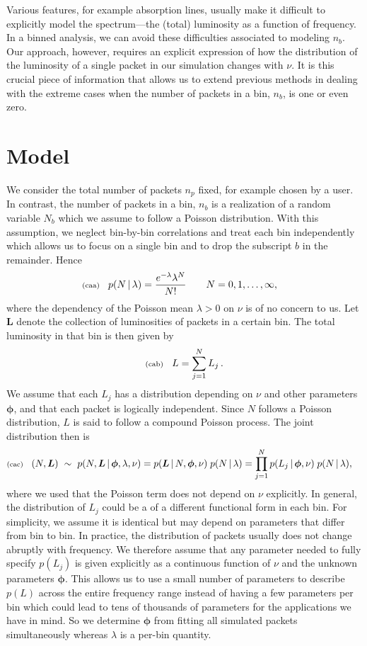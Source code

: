\documentclass[11pt]{article}
\newcommand{\fred}[1]{\todo[color=orange!40,inline]{#1}} %
\newcommand{\lleq}[1]{\label{#1} }
\renewcommand{\lleq}[1]{\label{#1} {\scriptstyle {\rm (#1)}} \hspace*{2ex} }
\newcommand{\cond}{\,|\,}
\newcommand{\bmL}{{\bm{L}}}
\newcommand{\bmphi}{{\bm{\phi}}}
\newcommand{\npack}{n_p}
\begin{document}
Various features, for example absorption lines, usually make it
difficult to explicitly model the spectrum---the (total) luminosity as
a function of frequency. In a binned analysis, we can avoid these
difficulties associated to modeling $n_b$. Our approach, however,
requires an explicit expression of how the distribution of the
luminosity of a single packet in our simulation changes with $\nu$. It
is this crucial piece of information that allows us to extend previous
methods \fred{Refs: Zech, maybe others, too} in dealing with the
extreme cases when the number of packets in a bin, $n_b$, is one or
even zero.

\section{Model} \label{sec:model}

We consider the total number of packets $\npack$ fixed, for example
chosen by a user. In contrast, the number of packets in a bin, $n_b$
is a realization of a random variable $N_b$ which we assume to follow
a Poisson distribution. With this assumption, we neglect bin-by-bin
correlations and treat each bin independently which allows us to focus
on a single bin and to drop the subscript $b$ in the remainder. Hence
\begin{align}
  \lleq{caa}
  p(N\cond\lambda) &= \frac{e^{-\lambda}\lambda^N}{N!}
  \qquad N = 0,1,\ldots,\infty ,
\end{align}
where the dependency of the Poisson mean $\lambda>0$ on $\nu$ is of no
concern to us. Let $\bmL$ denote the collection of luminosities of
packets in a certain bin. The total luminosity in that bin is then
given by
\begin{align}
  \lleq{cab}
  L = \sum_{j=1}^{N} L_j\,.
\end{align}
We assume that each $L_j$ has a distribution depending on $\nu$ and
other parameters $\bmphi$, and that each packet is logically
independent. Since $N$ follows a Poisson distribution, $L$ is said to
follow a compound Poisson process. The joint distribution then is
\begin{align}
  \lleq{cac}
  (N,\bmL) &\ \sim\ p(N,\bmL\cond \bmphi,\lambda, \nu)
  = p(\bmL\cond N,\bmphi, \nu)\; p(N\cond \lambda) = \prod_{j=1}^N p(L_j\cond \bmphi, \nu) \; p(N\cond \lambda),
\end{align}
where we used that the Poisson term does not depend on $\nu$
explicitly. In general, the distribution of $L_j$ could be a of a
different functional form in each bin. For simplicity, we assume it is
identical but may depend on parameters that differ from bin to bin. In
practice, the distribution of packets usually does not change abruptly
with frequency. We therefore assume that any parameter needed to fully
specify $p(L_j)$ is given explicitly as a continuous function of $\nu$
and the unknown parameters $\bmphi$. This allows us to use a small
number of parameters to describe $p(L)$ across the entire frequency
range instead of having a few parameters per bin which could lead to
tens of thousands of parameters for the applications we have in
mind. So we determine $\bmphi$ from fitting all simulated packets
simultaneously whereas $\lambda$ is a per-bin quantity.
\end{document}
